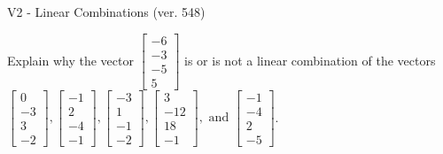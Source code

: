 \begin{exercise}
  \begin{exerciseTitle}V2 - Linear Combinations (ver. 548)\end{exerciseTitle}
  \begin{exerciseStatement}
    Explain why the vector \(\left[\begin{array}{c}
-6 \\
-3 \\
-5 \\
5
\end{array}\right]\)  is or is not a linear 
	combination of the vectors \(\left[\begin{array}{c}
0 \\
-3 \\
3 \\
-2
\end{array}\right] , \left[\begin{array}{c}
-1 \\
2 \\
-4 \\
-1
\end{array}\right] , \left[\begin{array}{c}
-3 \\
1 \\
-1 \\
-2
\end{array}\right] , \left[\begin{array}{c}
3 \\
-12 \\
18 \\
-1
\end{array}\right] , \text{ and } \left[\begin{array}{c}
-1 \\
-4 \\
2 \\
-5
\end{array}\right]\).
	



\end{exerciseStatement}
\end{exercise}
